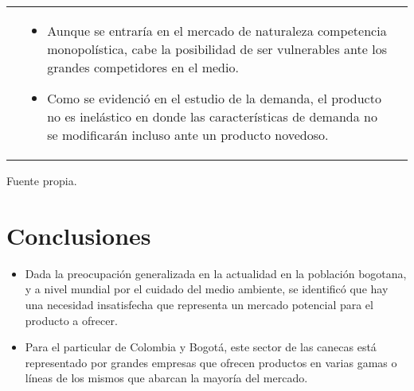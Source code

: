 \documentclass[letterpaper,12pt]{scrreprt}
\begin{document}
\begin{table}[H]
\begin{tabular}{|p{1.5cm}|p{7cm}|p{7cm}|}
{\begin{itemize}
    \end{itemize} } 
    &
    \parbox[p][0.4\textwidth][c]{7cm}{
    \begin{itemize}
        \item Aunque se entraría en el mercado de naturaleza competencia monopolística, cabe la posibilidad de ser vulnerables ante los grandes competidores en el medio.
        \item Como se evidenció en el estudio de la demanda, el producto no es inelástico en donde las características de demanda no se modificarán incluso ante un producto novedoso.
        
    \end{itemize} } 
    \\
    \hline
\end{tabular}
        \begin{flushright}
        \vspace{-0.3cm}
        {\scriptsize Fuente propia.} 
        \end{flushright}
        \end{table}



    \chapter{Conclusiones}
    
    \begin{itemize}
    \item  Dada  la  preocupación  generalizada  en  la  actualidad en  la  población  bogotana,
    y a nivel mundial por  el  cuidado  del  medio ambiente,  se identificó  que  hay  una  necesidad insatisfecha que representa un mercado potencial para el producto a ofrecer.
    
    \item Para  el  particular  de  Colombia  y  Bogotá, este sector de las canecas está representado por grandes empresas que ofrecen productos en varias gamas
    o líneas de los mismos que abarcan la mayoría del mercado.
    \end{itemize}
\end{document}
